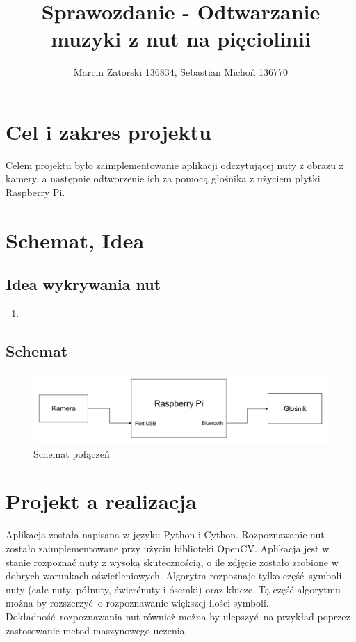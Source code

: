 \documentclass[12pt]{article}
\begin{document}
\title{Sprawozdanie - Odtwarzanie muzyki z nut na pięciolinii}
\author{Marcin Zatorski 136834, Sebastian Michoń 136770}
\date{\vspace{-2ex}}
\maketitle

\section{Cel i zakres projektu}
Celem projektu było zaimplementowanie aplikacji odczytującej nuty z obrazu z kamery, a następnie odtworzenie ich za pomocą głośnika z użyciem płytki Raspberry Pi.

\section{Schemat, Idea}
\subsection{Idea wykrywania nut}
\begin{enumerate}
	\item 
\end{enumerate}

\subsection{Schemat}
\begin{figure}[h!]
	\centering
	\includegraphics[width=0.9\linewidth]{SW-schematic.png}
	\caption{Schemat połączeń}
	\label{fig:schemat}
\end{figure}
	
\section{Projekt a realizacja}
Aplikacja została napisana w języku Python i Cython. Rozpoznawanie nut zostało zaimplementowane przy użyciu biblioteki OpenCV. Aplikacja jest w stanie rozpoznać nuty z wysoką skutecznością, o ile zdjęcie zostało zrobione w dobrych warunkach oświetleniowych. Algorytm rozpoznaje tylko część symboli - nuty (całe nuty, półnuty, ćwierćnuty i ósemki) oraz klucze. Tą część algorytmu można by rozszerzyć o rozpoznawanie większej ilości symboli. Dokładność rozpoznawania nut również można by ulepszyć na przykład poprzez zastosowanie metod maszynowego uczenia.
	
\end{document}
